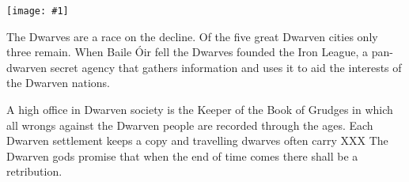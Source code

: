 \documentclass[a4paper]{dnd5}
\newcommand\inc[1]{
 \begin{center}\texttt{[image: \#1]}\end{center}
}
\begin{document}
\inc{dwarf_symbol.jpg}

The Dwarves are a race on the decline.  Of the five great Dwarven cities only three remain.  When Baile Óir fell the Dwarves founded the Iron League, a pan-dwarven secret agency that gathers information and uses it to aid the interests of the Dwarven nations.  


A high office in Dwarven society is the Keeper of the Book of Grudges in which all wrongs
against the Dwarven people are recorded through the ages.  Each Dwarven settlement keeps a
copy and travelling dwarves often carry XXX The Dwarven gods promise that when
the end of time comes there shall be a retribution.
\end{document}
